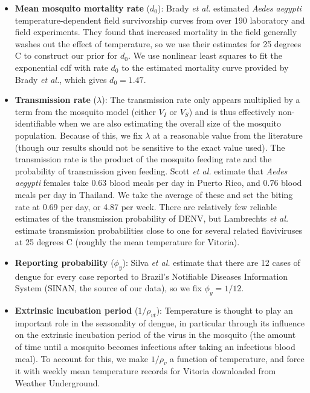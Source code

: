 \documentclass[12pt,letterpaper]{article}
\begin{document}
\begin{itemize}
\item \textbf{Mean mosquito mortality rate} ($d_0$): Brady \textit{et al.} \cite{Brady2013} estimated \textit{Aedes aegypti} temperature-dependent field survivorship curves from over 190 laboratory and field experiments.
They found that increased mortality in the field generally washes out the effect of temperature, so we use their estimates for 25 degrees C to construct our prior for $d_0$.  
We use nonlinear least squares to fit the exponential cdf with rate $d_0$ to the estimated mortality curve provided by Brady \textit{et al.}, which gives $d_0 = 1.47$.
\\
\item \textbf{Transmission rate} ($\lambda$): The transmission rate only appears multiplied by a term from the mosquito model (either $V_I$ or $V_S$) and is thus effectively non-identifiable when we are also estimating the overall size of the mosquito population.
Because of this, we fix $\lambda$ at a reasonable value from the literature (though our results should not be sensitive to the exact value used).
The transmission rate is the product of the mosquito feeding rate and the probability of transmission given feeding.
Scott \textit{et al.} \cite{Scott2000} estimate that \textit{Aedes aegypti} females take 0.63 blood meals per day in Puerto Rico, and 0.76 blood meals per day in Thailand.
We take the average of these and set the biting rate at 0.69 per day, or 4.87 per week.
There are relatively few reliable estimates of the transmission probability of DENV, but Lambrechts \textit{et al.} \cite{Lambrechts2011} estimate transmission probabilities close to one  for several related flaviviruses at 25 degrees C (roughly the mean temperature for Vitoria).
\\
\item \textbf{Reporting probability} ($\phi_y$): Silva \textit{et al.} \cite{Silva2016} estimate that there are 12 cases of dengue for every case reported to Brazil's Notifiable Diseases Information System (SINAN, the source of our data), so we fix $\phi_y = 1/12$.
\\
\item \textbf{Extrinsic incubation period} ($1/\rho_{vt}$): Temperature is thought to play an important role in the seasonality of dengue, in particular through its influence on the extrinsic incubation period of the virus in the mosquito  (the amount of time until a mosquito becomes infectious after taking an infectious blood meal).
To account for this, we make $1/\rho_v$ a function of temperature, and force it with weekly mean temperature records for Vitoria downloaded from Weather Underground.

\end{itemize}
\end{document}
